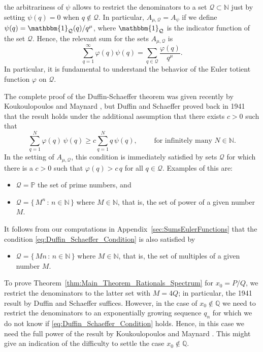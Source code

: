 \documentclass[11pt,reqno]{amsart}
\theoremstyle{definition}
\begin{document}
the arbitrariness of $\psi$ allows to restrict the denominators to a set $\mathcal Q \subset \mathbb N$ just by setting $\psi(q) = 0$ when $q \not\in \mathcal Q$. 
In particular, $A_{\mu,\mathcal Q} = A_\psi$ if we define $\psi(q) = \mathbbm{1}_{\mathcal Q}(q) / q^\mu$, where $\mathbbm{1}_{\mathcal Q}$ is the indicator function of the set $\mathcal Q$. 
Hence, the relevant sum for the sets $A_{\mu,\mathcal Q}$ is
\begin{equation}\label{eq:Our_Relevant_Sum}
\sum_{q=1}^\infty \varphi(q) \psi(q) = \sum_{q \in \mathcal Q} \frac{\varphi(q)}{q^\mu}.
\end{equation}
In particular, it is fundamental to understand the behavior of the Euler totient function $\varphi$ on $\mathcal Q$. 

The complete proof of the Duffin-Schaeffer theorem was given recently by Koukoulopoulos and Maynard 
\cite[Theorem 1]{KoukoulopoulosMaynard2020}, 
but Duffin and Schaeffer \cite{DuffinSchaeffer1941} proved back in 1941 that the result holds under the additional assumption that there exists $c > 0$ such that
\begin{equation}\label{eq:Duffin_Schaeffer_Condition}
\sum_{q=1}^N \varphi(q) \, \psi(q) \geq c \sum_{q=1}^N q \, \psi(q), \qquad \text{ for infinitely many } N \in \mathbb N. 
\end{equation} 
In the setting of $A_{\mu,\mathcal Q}$, 
this condition is immediately satisfied by sets $\mathcal Q$ for which there is a $c > 0$ such that $\varphi(q) > c \,  q$ for all $q \in \mathcal Q$. Examples of this are:
\begin{itemize}
	\item $\mathcal Q = \mathbb P$ the set of prime numbers, and
	\item $\mathcal Q = \{ \, M^n \, : \, n \in \mathbb N \,   \}$ where $M \in \mathbb N$, that is, the set of power of a given number $M$. 
\end{itemize} 
It follows from our computations in Appendix~\ref{sec:SumsEulerFunctions} that the condition \eqref{eq:Duffin_Schaeffer_Condition} is also satisfied by 
\begin{itemize}
	\item $\mathcal Q = \{ \, Mn \, : \, n \in \mathbb N \,   \}$ where $M \in \mathbb N$, that is,  the set of multiples of a given number $M$. 
\end{itemize}
To prove Theorem~\ref{thm:Main_Theorem_Rationals_Spectrum} for $x_0 = P/Q$, we restrict the denominators to the latter set with $M = 4Q$; in particular, the 1941 result by Duffin and Schaeffer  \cite{DuffinSchaeffer1941} suffices.  
However, in the case of $x_0 \not\in \mathbb Q$ we need to restrict the denominators to an exponentially growing sequence $q_n$ for which we do not know if \eqref{eq:Duffin_Schaeffer_Condition} holds. 
Hence, in this case we need the full power of the result by Koukoulopoulos and Maynard \cite{KoukoulopoulosMaynard2020}. 
This might give an indication of the difficulty to settle the case $x_0 \not\in \mathbb Q$. 
\end{document}

